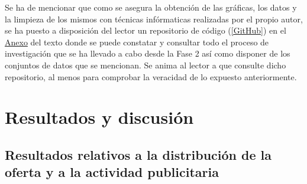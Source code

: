 \documentclass[a4paper,10pt]{article}
\begin{document}
\begin{multicols}{2}
            \noindent
            Se ha de mencionar que como se asegura la obtención de las gráficas, los datos y la limpieza de los mismos con técnicas infórmaticas realizadas por el 
            propio autor, se ha puesto a disposición del lector un repositorio de código (\hyperlink{github}{[GitHub]}) en el \hyperlink{anexo}{Anexo} 
            del texto donde se puede constatar y consultar todo el proceso de investigación que se ha llevado a cabo desde la Fase 2 así como disponer de los conjuntos de datos que se mencionan. Se anima al lector a que consulte dicho repositorio, al menos para comprobar la veracidad de lo expuesto     anteriormente.

    \end{multicols}
    \setlength{\columnsep}{10pt}

    \section{Resultados y discusión}


        \subsection{Resultados relativos a la distribución de la oferta y a la actividad publicitaria}
\end{document}
